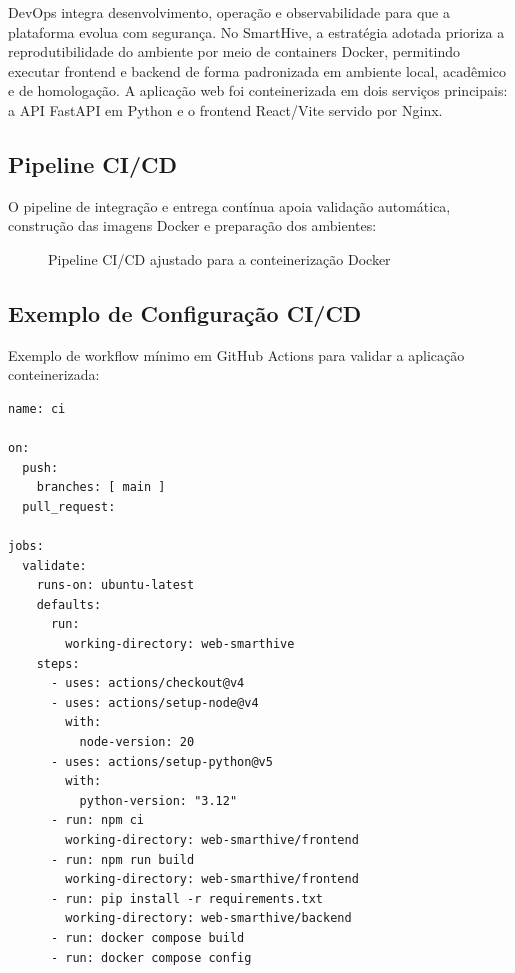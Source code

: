 \documentclass[11pt,a4paper]{article}
\begin{document}
DevOps \cite{wang2023} integra desenvolvimento, operação e observabilidade para que a plataforma evolua com segurança. No SmartHive, a estratégia adotada prioriza a reprodutibilidade do ambiente por meio de containers Docker, permitindo executar frontend e backend de forma padronizada em ambiente local, acadêmico e de homologação. A aplicação web foi conteinerizada em dois serviços principais: a API FastAPI em Python e o frontend React/Vite servido por Nginx.

\subsection{Pipeline CI/CD}

O pipeline de integração e entrega contínua apoia validação automática, construção das imagens Docker e preparação dos ambientes:

\begin{figure}[H]
\centering
{}
\caption{Pipeline CI/CD ajustado para a conteinerização Docker}
\label{fig:cicd}
\end{figure}

\subsection{Exemplo de Configuração CI/CD}

Exemplo de workflow mínimo em GitHub Actions para validar a aplicação conteinerizada:

\begin{verbatim}
name: ci

on:
  push:
    branches: [ main ]
  pull_request:

jobs:
  validate:
    runs-on: ubuntu-latest
    defaults:
      run:
        working-directory: web-smarthive
    steps:
      - uses: actions/checkout@v4
      - uses: actions/setup-node@v4
        with:
          node-version: 20
      - uses: actions/setup-python@v5
        with:
          python-version: "3.12"
      - run: npm ci
        working-directory: web-smarthive/frontend
      - run: npm run build
        working-directory: web-smarthive/frontend
      - run: pip install -r requirements.txt
        working-directory: web-smarthive/backend
      - run: docker compose build
      - run: docker compose config
\end{verbatim}
\end{document}
